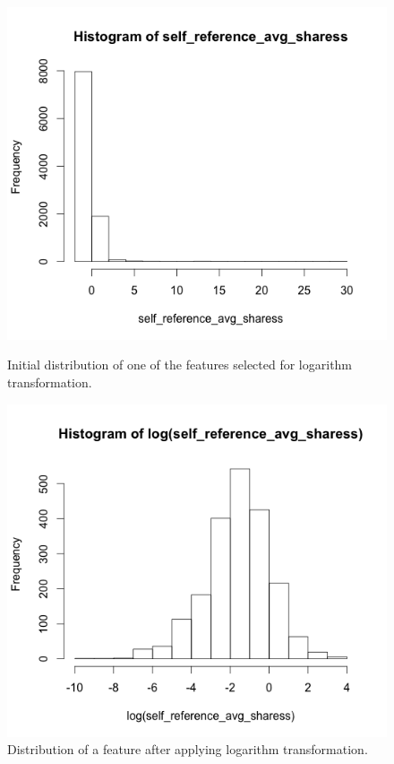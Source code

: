  
\begin{figure}[h!]
\centering
\begin{minipage}[h]{0.45\linewidth}
\includegraphics[width=1\linewidth]{images/hist_of_ref_avg_shares}
\caption{Initial distribution of one of the features selected for logarithm transformation.}
\label{fig:hist_of_ref_avg_shares}
\end{minipage}
\hfill
\begin{minipage}[h]{0.45\linewidth}
\includegraphics[width=1\linewidth]{images/hist_log_self_ref_avg_shares}
\caption{Distribution of a feature after applying logarithm transformation.}
\label{fig:hist_log_self_ref_avg_shares}
\end{minipage}
\end{figure}

